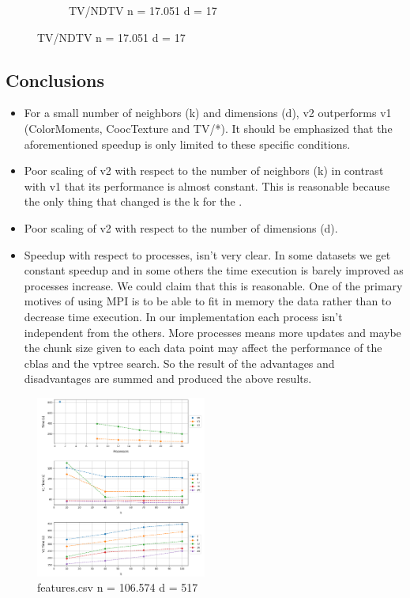\documentclass[12pt, a4paper]{article}
\begin{document}
\begin{figure}[h!]
\begin{subfigure}[b]{0.33\textwidth}
         \caption{TV/NDTV n = 17.051 d = 17} 
     \end{subfigure}
\end{figure}

\pagebreak

\subsection{Conclusions}

\begin{itemize}
\itemsep-0.2em 
\item For a small number of neighbors (k) and dimensions (d), v2 outperforms v1 (ColorMoments, CoocTexture and TV/*). It should be emphasized that the aforementioned speedup is only limited to these specific conditions. 
\item Poor scaling of v2 with respect to the number of neighbors (k) in contrast with v1 that its performance is almost constant. This is reasonable because the only thing that changed is the k for the .
    \item Poor scaling of v2 with respect to the number of dimensions (d).
    \item Speedup with respect to processes, isn't very clear. In some datasets we get constant speedup and in some others the time execution is barely improved as processes increase. We could claim that this is reasonable. One of the primary motives of using MPI is to be able to fit in memory the data rather than to decrease time execution. In our implementation each process isn't independent from the others. More processes means more updates and maybe the chunk size given to each data point may affect the performance of the cblas and the vptree search. So the result of the advantages and disadvantages are summed and produced the above results.

\end{itemize}

\begin{figure}
    \centering
    \includegraphics[height=.2\textheight, width=0.5\textwidth, keepaspectratio]{assets/black_sheep.png}
    \caption{features.csv \newline n = 106.574 d = 517}
\end{figure}
\end{document}
